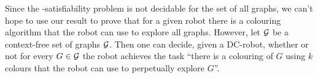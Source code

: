 Since the \msol-satisfiability problem is not decidable for the set of all graphs, we can't hope to use our result to prove that for a given robot there is a colouring algorithm that the robot can use to explore all graphs. However, let $\mathcal{G}$ be a context-free set of graphs $\mathcal{G}$. Then one can decide, given a DC-robot, whether or not for every $G \in \mathcal{G}$ the robot achieves the task ``there is a colouring of $G$ using $k$ colours that the robot can use to perpetually explore $G$''. 





%



\fi

